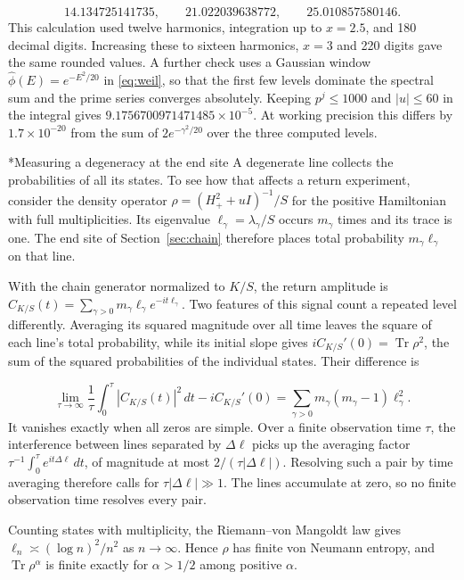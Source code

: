 \documentclass[11pt,letterpaper]{article}
\makeatletter
\renewcommand\subsection{\@startsection{subsection}{2}{\z@}{-2.0ex plus -.3ex}{.75ex}{\normalfont\normalsize\itshape}}
\numberwithin{equation}{section}
\makeatother
\begin{document}
\[
 14.134725141735,\qquad 21.022039638772,\qquad 25.010857580146.
\]
This calculation used twelve harmonics, integration up to $x=2.5$, and 180 decimal digits. Increasing these to sixteen harmonics, $x=3$ and 220 digits gave the same rounded values. A further check uses a Gaussian window $\widehat\phi(E)=e^{-E^2/20}$ in \eqref{eq:weil}, so that the first few levels dominate the spectral sum and the prime series converges absolutely. Keeping $p^j\le1000$ and $|u|\le60$ in the integral gives $9.1756700971471485\times10^{-5}$. At working precision this differs by $1.7\times10^{-20}$ from the sum of $2e^{-\gamma^2/20}$ over the three computed levels.

\subsection*{Measuring a degeneracy at the end site}
A degenerate line collects the probabilities of all its states. To see how that affects a return experiment, consider the density operator $\rho=(H_+^2+uI)^{-1}/S$ for the positive Hamiltonian with full multiplicities. Its eigenvalue $\ell_\gamma=\lambda_\gamma/S$ occurs $m_\gamma$ times and its trace is one. The end site of Section~\ref{sec:chain} therefore places total probability $m_\gamma\ell_\gamma$ on that line.

With the chain generator normalized to $K/S$, the return amplitude is $C_{K/S}(t)=\sum_{\gamma>0}m_\gamma\ell_\gamma e^{-it\ell_\gamma}$. Two features of this signal count a repeated level differently. Averaging its squared magnitude over all time leaves the square of each line's total probability, while its initial slope gives $iC_{K/S}'(0)=\operatorname{Tr}\rho^2$, the sum of the squared probabilities of the individual states. Their difference is

\[
 \lim_{\tau\to\infty}\frac1{\tau}\int_0^\tau |C_{K/S}(t)|^2\,dt-iC_{K/S}'(0)
   =\sum_{\gamma>0}m_\gamma(m_\gamma-1)\ell_\gamma^2 .
\]
It vanishes exactly when all zeros are simple. Over a finite observation time $\tau$, the interference between lines separated by $\Delta\ell$ picks up the averaging factor $\tau^{-1}\int_0^\tau e^{it\Delta\ell}\,dt$, of magnitude at most $2/(\tau|\Delta\ell|)$. Resolving such a pair by time averaging therefore calls for $\tau|\Delta\ell|\gg1$. The lines accumulate at zero, so no finite observation time resolves every pair.

Counting states with
multiplicity, the Riemann--von Mangoldt law gives
$\ell_n\asymp(\log n)^2/n^2$ as $n\to\infty$. Hence $\rho$ has finite
von Neumann entropy, and $\operatorname{Tr}\rho^\alpha$ is finite exactly
for $\alpha>1/2$ among positive $\alpha$.
\end{document}
